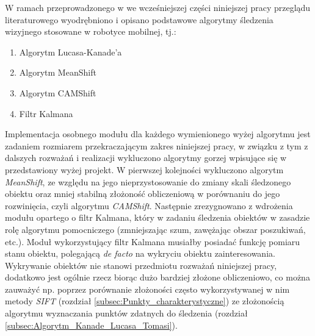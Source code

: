 W ramach przeprowadzonego w we wcześniejszej części niniejszej pracy przeglądu literaturowego wyodrębniono i opisano podstawowe algorytmy śledzenia wizyjnego stosowane w robotyce mobilnej, tj.:

\begin{enumerate}

	\item Algorytm Lucasa-Kanade'a
	\item Algorytm MeanShift
	\item Algorytm CAMShift
	\item Filtr Kalmana

\end{enumerate}

Implementacja osobnego modułu dla każdego wymienionego wyżej algorytmu jest zadaniem rozmiarem przekraczającym zakres niniejszej pracy, w związku z tym z dalszych rozważań i realizacji wykluczono algorytmy gorzej wpisujące się w przedstawiony wyżej projekt. W pierwszej kolejności wykluczono algorytm \textit{MeanShift}, ze względu na jego nieprzystosowanie do zmiany skali śledzonego obiektu oraz mniej stabilną złożoność obliczeniową w porównaniu do jego rozwinięcia, czyli algorytmu \textit{CAMShift}. Następnie zrezygnowano z wdrożenia modułu opartego o filtr Kalmana, który w zadaniu śledzenia obiektów w zasadzie rolę algorytmu pomocniczego (zmniejszając szum, zawężając obszar poszukiwań, etc.). Moduł wykorzystujący filtr Kalmana musiałby posiadać funkcję pomiaru stanu obiektu, polegającą \textit{de facto} na wykryciu obiektu zainteresowania. Wykrywanie obiektów nie stanowi przedmiotu rozważań niniejszej pracy, dodatkowo jest ogólnie rzecz biorąc dużo bardziej złożone obliczeniowo, co można zauważyć np. poprzez porównanie złożoności często wykorzystywanej w nim metody \textit{SIFT} (rozdział \ref{subsec:Punkty_charakterystyczne}) ze złożonością algorytmu wyznaczania punktów zdatnych do śledzenia (rozdział \ref{subsec:Algorytm_Kanade_Lucasa_Tomasi}).